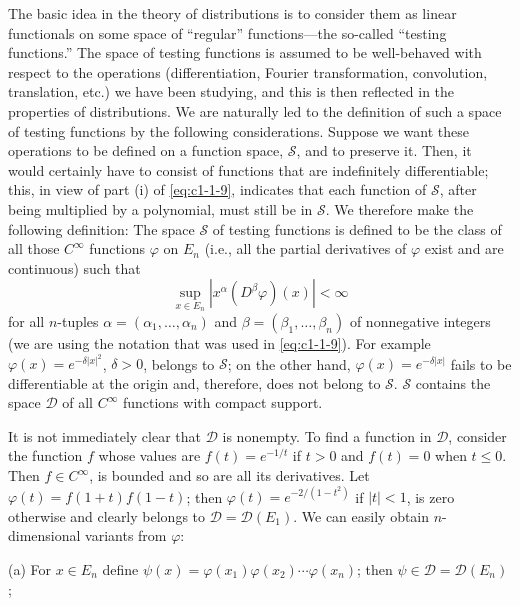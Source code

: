 The basic idea in the theory of distributions is to consider them as linear
functionals on some space of ``regular'' functions---the so-called ``testing
functions.'' The space of testing functions is assumed to be well-behaved with
respect to the operations (differentiation, Fourier transformation,
convolution, translation, etc.) we have been studying, and this is then
reflected in the properties of distributions. We are naturally led to the
definition of such a space of testing functions by the following
considerations. Suppose we want these operations to be defined on a function
space, $\mathscr{S}$, and to preserve it. Then, it would certainly have to
consist of functions that are indefinitely differentiable; this, in view of
part (i) of \eqref{eq:c1-1-9}, indicates that each function of
$\mathscr{S}$, after being multiplied by a polynomial, must still be in
$\mathscr{S}$. We therefore make the following definition: The space
$\mathscr{S}$ of testing functions is defined to be the class of all those
$C^{\infty}$ functions $\varphi$ on $E_{n}$ (i.e., all the partial derivatives
of $\varphi$ exist and are continuous) such that
\begin{equation}\label{eq:c1-3-1}
\sup_{x\in E_{n}}\left|x^{\alpha}(D^{\beta}\varphi)(x)\right|<\infty
\end{equation}
for all $n$-tuples $\alpha = (\alpha_{1}, \ldots, \alpha_{n})$ and
$\beta = (\beta_{1}, \ldots, \beta_{n})$ of nonnegative integers (we are using
the notation that was used in \eqref{eq:c1-1-9}). For example
$\varphi(x) = e^{-\delta|x|^{2}}$, $\delta > 0$, belongs to $\mathscr{S}$; on
the other hand, $\varphi(x) = e^{-\delta|x|}$ fails to be differentiable at
the origin and, therefore, does not belong to $\mathscr{S}$. $\mathscr{S}$
contains the space $\mathscr{D}$ of all $C^{\infty}$ functions with compact
support.

It is not immediately clear that $\mathscr{D}$ is nonempty. To find a function
in $\mathscr{D}$, consider the function $f$ whose values are $f(t) = e^{-1/t}$
if $t > 0$ and $f(t) = 0$ when $t \leq 0$. Then $f \in C^{\infty}$, is bounded
and so are all its derivatives. Let $\varphi(t) = f(1 + t)f(1 - t)$; then
$\varphi(t) = e^{-2/(1 - t^{2})}$ if $|t| < 1$, is zero otherwise and clearly
belongs to $\mathscr{D} = \mathscr{D}(E_{1})$. We can easily obtain
$n$-dimensional variants from $\varphi$:

\textup{(a)} For $x \in E_{n}$ define
$\psi(x) = \varphi(x_{1})\varphi(x_{2}) \cdots \varphi(x_{n})$; then
$\psi \in \mathscr{D} = \mathscr{D}(E_{n})$;

